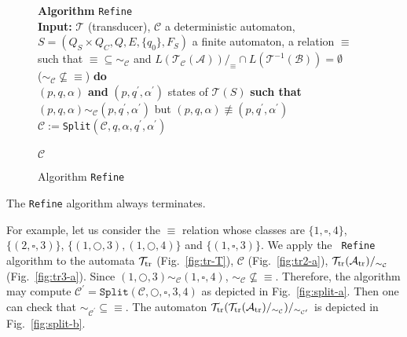 \documentclass[]{llncs}
\def \sp {\hspace*{0.8cm}}
\def \A {\mathcal{A}}
\def \T {\mathcal{T}}
\def \B {\mathcal{B}}
\def \C {\mathcal{C}}
\begin{document}
\begin{figure}[tb]
{\bf Algorithm} {\tt Refine}\\
{\bf Input:} $\T$ (transducer), $\C$ a deterministic automaton,
$S=(Q_S\times Q_C,Q,E,\{q_0\},F_S)$ a finite automaton, a relation $\equiv$
such that $\equiv\subseteq \sim_{\C}$ and 
$L(\T_\C(\A))/_\equiv\cap L(\T^{-1}(\B))=\emptyset$\\
\sp {\bf While} ($\sim_\C\not\subseteq\equiv$) {\bf do}\\
\sp\sp {\bf Choose} $(p,q,\alpha)$ {\bf and} $(p,q^\prime,\alpha^\prime)$
states of $\T(S)$ {\bf such that}\\
\sp\sp\sp$(p,q,\alpha)\sim_\C(p,q^\prime,\alpha^\prime)$ but
$(p,q,\alpha)\not\equiv(p,q^\prime,\alpha^\prime)$ \\
\sp\sp $\C:=${\tt Split}$(\C,q,\alpha,q^\prime,\alpha^\prime)$ \\
\sp {\bf EndWhile}\\ 
\sp {\bf Return} $\C$
\caption{Algorithm {\tt Refine}}\label{algo:raff2}
\end{figure}

\begin{proposition}\label{prop-refine}
  The  {\tt Refine} algorithm always terminates.
\end{proposition}




























For example, let us consider the $\equiv$ relation whose classes are
$\{1,\square,4\}$, $\{(2,\square,3)\}$, $\{(1,\bigcirc,3),(1,\bigcirc,4)\}$
and $\{(1,\square,3)\}$.  We apply the {\tt
  Refine} algorithm to the automata $\T_{\rm tr}$
(Fig.~\ref{fig:tr-T}), $\C$ (Fig.~\ref{fig:tr2-a}), $\T_{\rm
  tr}(\A_{\rm tr})/_{\sim_\C}$ (Fig.~\ref{fig:tr3-a}).  Since
$(1,\bigcirc,3)\sim_\C (1,\square,4)$, $\sim_\C\not\subseteq
\equiv$. Therefore, the algorithm may compute
$\C^\prime=\mathtt{Split}(\C,\bigcirc,\square,3,4)$ as depicted in
Fig.~\ref{fig:split-a}. Then one can check that
$\sim_{\C^\prime}\subseteq \equiv$. The automaton $\T_{\rm tr}(\T_{\rm
  tr}(\A_{\rm tr})/_{\sim_\C})/_{\sim_{\C^\prime}}$ is depicted in
Fig.~\ref{fig:split-b}.
\end{document}
